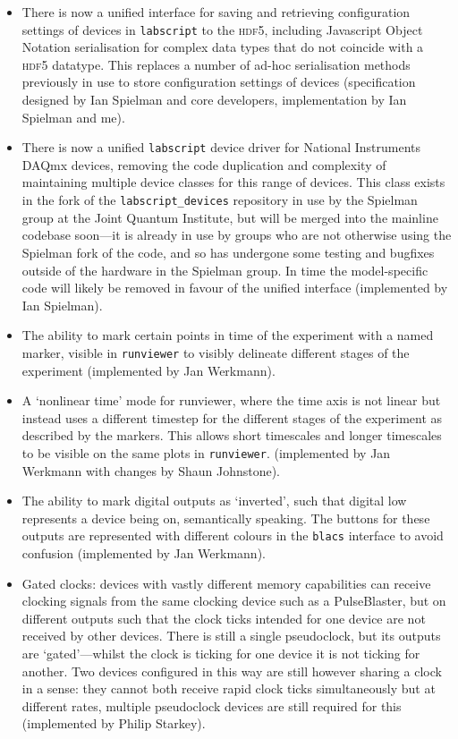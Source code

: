 \begin{itemize}
    \item There is now a unified interface for saving and retrieving configuration settings of devices in \texttt{labscript} to the \textsc{hdf5}, including Javascript Object Notation serialisation for complex data types that do not coincide with a \textsc{hdf5} datatype. This replaces a number of ad-hoc serialisation methods previously in use to store configuration settings of devices (specification designed by Ian Spielman and core developers, implementation by Ian Spielman and me).
    
    \item There is now a unified \texttt{labscript} device driver for National Instruments DAQmx devices, removing the code duplication and complexity of maintaining multiple device classes for this range of devices. This class exists in the fork of the \texttt{labscript\_devices} repository in use by the Spielman group at the Joint Quantum Institute, but will be merged into the mainline codebase soon---it is already in use by groups who are not otherwise using the Spielman fork of the code, and so has undergone some testing and bugfixes outside of the hardware in the Spielman group. In time the model-specific code will likely be removed in favour of the unified interface (implemented by Ian Spielman).
    
    \item The ability to mark certain points in time of the experiment with a named marker, visible in \texttt{runviewer} to visibly delineate different stages of the experiment (implemented by Jan Werkmann).
    
    \item A `nonlinear time' mode for runviewer, where the time axis is not linear but instead uses a different timestep for the different stages of the experiment as described by the markers. This allows short timescales and longer timescales to be visible on the same plots in \texttt{runviewer}. (implemented by Jan Werkmann with changes by Shaun Johnstone).
    
    \item The ability to mark digital outputs as `inverted', such that digital low represents a device being on, semantically speaking. The buttons for these outputs are represented with different colours in the \texttt{blacs} interface to avoid confusion (implemented by Jan Werkmann).
    
    \item Gated clocks: devices with vastly different memory capabilities can receive clocking signals from the same clocking device such as a PulseBlaster, but on different outputs such that the clock ticks intended for one device are not received by other devices. There is still a single pseudoclock, but its outputs are `gated'---whilst the clock is ticking for one device it is not ticking for another. Two devices configured in this way are still however sharing a clock in a sense: they cannot both receive rapid clock ticks simultaneously but at different rates, multiple pseudoclock devices are still required for this (implemented by Philip Starkey).
    

\end{itemize}
